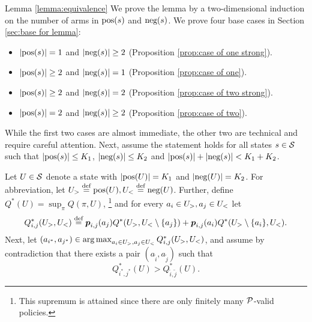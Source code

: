 \begin{proofof}{Lemma \ref{lemma:equivalence}}
We prove the lemma by a two-dimensional induction on the number of arms in $\textnormal{pos}(s)$ and $\textnormal{neg}(s)$. We prove four base cases in Section \ref{sec:base for lemma}:
\begin{itemize}
\item $\left| \textnormal{pos}(s) \right|=1$ and $\left| \textnormal{neg}(s) \right|\geq 2$ (Proposition \ref{prop:case of one strong}).
\item $\left| \textnormal{pos}(s) \right|\geq 2 $ and $\left| \textnormal{neg}(s) \right| = 1$ (Proposition \ref{prop:case of one}).
\item $\left| \textnormal{pos}(s) \right|\geq 2$ and $\left| \textnormal{neg}(s) \right| = 2$ (Proposition \ref{prop:case of two strong}).
\item $\left| \textnormal{pos}(s) \right|=2$ and $\left| \textnormal{neg}(s) \right|\geq 2$ (Proposition \ref{prop:case of two}).
\end{itemize}
While the first two cases are almost immediate, the other two are technical and require careful attention. Next, assume the statement holds for all states $s\in \mathcal{S}$ such that $\left| \textnormal{pos}(s) \right|\leq K_1$, $\left| \textnormal{neg}(s) \right|\leq K_2$ and $\left| \textnormal{pos}(s) \right|+\left| \textnormal{neg}(s) \right|< K_1+K_2$.


Let $U\in\mathcal{S}$ denote a state with $\left| \textnormal{pos}(U) \right|=K_1$ and $\left| \textnormal{neg}(U) \right|=K_2$. For abbreviation, let $U_>\stackrel{\text{def}}{=}\textnormal{pos}(U),U_<\stackrel{\text{def}}{=}\textnormal{neg}(U)$. Further, define $Q^*(U) = \sup_{\pi} Q(\pi,U)$, \footnote{This supremum is attained since there are only finitely many $\mathcal{P}$-valid policies.} and for every $a_i \in U_>, a_j\in U_<$ let 
\[
Q^*_{i,j}(U_>,U_<)\stackrel{\text{def}}{=}\boldsymbol{ p }_{i,j}(a_j)Q^*(U_>,U_<\setminus \{a_j\}) +\boldsymbol{ p }_{i,j}(a_i)Q^*(U_>\setminus\{a_i\},U_<).
\]
Next, let $(a_{i^*},a_{j^*})\in \operatorname*{arg\,max}_{a_i\in U_>,a_j\in U_<}Q^*_{i,j}(U_>,U_<)$, and assume by contradiction that there exists a pair $(a_{\tilde i}, a_{\tilde j})$ such that 
\begin{equation}\label{eq:contradiction of lemma}
Q^*_{{i^*},{j^*}}(U) > Q^*_{{\tilde i}, {\tilde j}}(U).
\end{equation}

\end{proofof}
